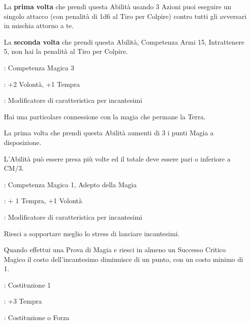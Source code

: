 \begin{multicols}{2}
La \textbf{prima volta} che prendi questa Abilità usando 3 Azioni puoi eseguire un singolo attacco (con penalità di 1d6 al Tiro per Colpire) contro tutti gli avversari in mischia attorno a te.

La \textbf{seconda volta} che prendi questa Abilità, Competenza Armi 15, Intrattenere 5, non hai la penalità al Tiro per Colpire.

\begin{description}[noitemsep, topsep=0pt, parsep=0pt, partopsep=0pt, leftmargin=0cm, labelwidth=2.5cm]
    \item[\textbf{Requisito}]: Competenza Magica 3
    \item[\textbf{Tiri Salvezza}]: +2 Volontà, +1 Tempra
    \item[\textbf{Caratteristica}]: Modificatore di caratteristica per incantesimi
\end{description}

Hai una particolare connessione con la magia che permane la Terra.

La prima volta che prendi questa Abilità aumenti di 3 i punti Magia a disposizione.

L'Abilità può essere presa più volte ed il totale deve essere pari o inferiore a CM/3.

\begin{description}[noitemsep, topsep=0pt, parsep=0pt, partopsep=0pt, leftmargin=0cm, labelwidth=2.5cm]
    \item[\textbf{Requisito}]: Competenza Magica 1, Adepto della Magia
    \item[\textbf{Tiri Salvezza}]: + 1 Tempra, +1 Volontà
    \item[\textbf{Caratteristica}]: Modificatore di caratteristica per incantesimi
\end{description}

Riesci a sopportare meglio lo stress di lanciare incantesimi.

Quando effettui una Prova di Magia e riesci in almeno un Successo Critico Magico il costo dell'incantesimo diminuisce di un punto, con un costo minimo di 1.

\begin{description}[noitemsep, topsep=0pt, parsep=0pt, partopsep=0pt, leftmargin=0cm, labelwidth=2.5cm]
	\item[\textbf{Requisito}]: Costituzione 1
	\item[\textbf{Tiri Salvezza}]: +3 Tempra
	\item[\textbf{Caratteristica}]: Costituzione o Forza
\end{description}


\end{multicols}

